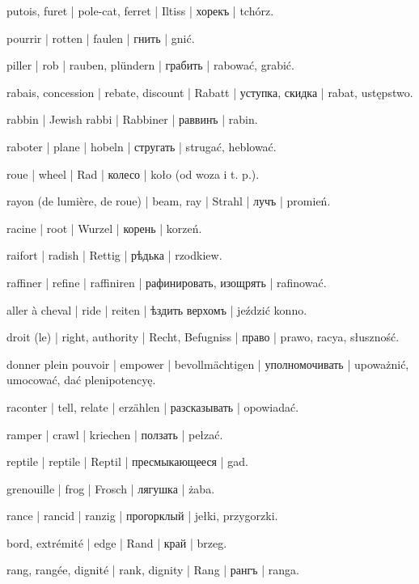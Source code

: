 \begin{outdent}{1em}
putois, furet | pole-cat, ferret | Iltiss | хорекъ | tchórz.

pourrir | rotten | faulen | гнить | gnić.


piller | rob | rauben, plündern | грабить | rabować, grabić.

rabais, concession | rebate, discount | Rabatt | уступка,
скидка | rabat, ustępstwo.

rabbin | Jewish rabbi | Rabbiner | раввинъ | rabin.

raboter | plane | hobeln | стругать | strugać, heblować.

roue | wheel | Rad | колесо | koło (od woza i t. p.).

rayon (de lumière, de roue) | beam, ray | Strahl | лучъ | promień.

racine | root | Wurzel | корень | korzeń.

raifort | radish | Rettig | рѣдька | rzodkiew.

raffiner | refine | raffiniren | рафинировать, изощрять | rafinować.

aller à cheval | ride | reiten | ѣздить верхомъ | jeździć
konno.

droit (le) | right, authority | Recht, Befugniss | право | prawo, racya, słuszność.

\uvsubentry{}
donner plein pouvoir | empower | bevollmächtigen | уполномочивать | upoważnić, umocować, dać plenipotencyę.

raconter | tell, relate | erzählen | разсказывать | opowiadać.

ramper | crawl | kriechen | ползать | pełzać.

\uvsubentry{}
reptile | reptile | Reptil | пресмыкающееся | gad.

grenouille | frog | Frosch | лягушка | żaba.

rance | rancid | ranzig | прогорклый | jełki, przygorzki.

bord, extrémité | edge | Rand | край | brzeg.

rang, rangée, dignité | rank, dignity | Rang | рангъ | ranga.


\end{outdent}
